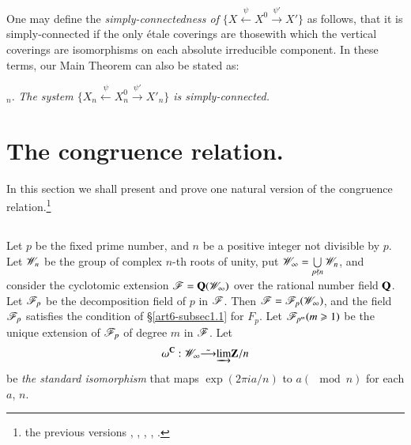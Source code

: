 One may define the \textit{simply-connectedness of} $\{X \xleftarrow{\psi} X^0 \xrightarrow{\psi'} X'\}$ as follows, that it is simply-connected if the only \'etale coverings are those\pageoriginale with which the vertical coverings are isomorphisms on each absolute irreducible component. In these terms, our Main Theorem can also be stated as:

\medskip
\noindent
[MT 6]$_n$. \textit{The system $\{X_n \xleftarrow{\psi} X^0_n \xrightarrow{\psi'} X'_n\}$ is simply-connected.}

\section{The congruence relation.}\label{art6-sec5}
In this section we shall present and prove one natural version of the congruence relation.\footnote{\cf the previous versions \cite{art6-key3}, \cite{art6-key17}, \cite{art6-key6}, \cite{art6-key1}, \cite{art6-key18}.}


\subsection{}\label{art6-subsec5.1}
Let $p$ be the fixed prime number, and $n$ be a positive integer not divisible by $p$. Let $\mathscr{W}_n$ be the group of complex $n$-th roots of unity, put $\mathscr{W}_\infty = \bigcup\limits_{p \nmid n} \mathscr{W}_n$, and consider the cyclotomic extension $\mathscr{F} = \mathbf{Q} (\mathscr{W}_\infty)$ over the rational number field $\mathbf{Q}$. Let $\mathscr{F}_p$ be the decomposition field of $p$ in $\mathscr{F}$. Then $\mathscr{F} = \mathscr{F}_p (\mathscr{W}_\infty)$, and the field $\mathscr{F}_p$ satisfies the condition of \S \ref{art6-subsec1.1} for $F_p$. Let $\mathscr{F}_{p^m}(m \geqslant 1)$ be the unique extension of $\mathscr{F}_p$ of degree $m$ in $\mathscr{F}$. Let
\setcounter{equation}{0}
\begin{equation}
\omega^{\mathbf{C}} : \mathscr{W}_\infty \tilde{\longrightarrow} \underrightarrow{\lim} \mathbf{Z}/n 
\label{art6-eq5.1.1}
\end{equation}
be \textit{the standard isomorphism} that maps $\exp (2 \pi i a /n)$ to $a (\mod n)$ for each $a$, $n$.

